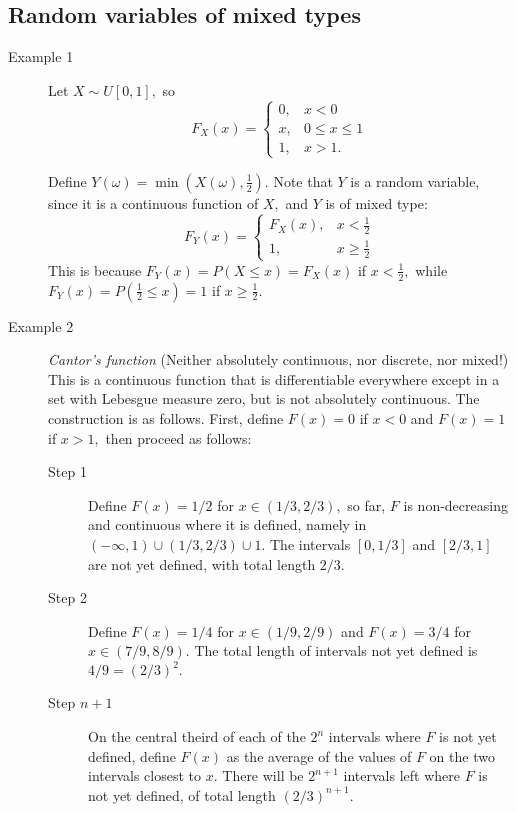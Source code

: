 \documentclass[12pt]{report} \addtolength{\textheight}{2in}
\begin{document}
\subsection*{Random variables of mixed types}
\begin{description}
\item[Example 1]
Let $X \sim U[0,1],$ so
\begin{displaymath}
F_X(x)=
\begin{cases}
0, & x <0\\
x, & 0\leq x \leq 1\\
1, & x > 1.
\end{cases}
\end{displaymath}

Define $Y(\omega)=\min (X(\omega),\frac{1}{2}).$ Note that $Y$ is a random variable, since it is a continuous function of $X,$ and $Y$ is of mixed type:
\begin{displaymath}
F_Y(x)= 
\begin{cases}
F_X(x), & x <\frac{1}{2}\\
1,& x \geq \frac{1}{2}
\end{cases}
\end{displaymath}
This is because $F_Y(x)=P(X \leq x)= F_X(x)$ if $x < \frac{1}{2},$ while $F_Y(x)=P(\frac{1}{2} \leq x)=1$ if $x\geq \frac{1}{2}.$
\item[Example 2] \textit{Cantor's function} (Neither absolutely continuous, nor discrete, nor mixed!) This is a continuous function that is differentiable everywhere except in a set with Lebesgue measure zero, but is not absolutely continuous. The construction is as follows. First, define $F(x)=0$ if $x < 0$ and $F(x)=1$ if $x > 1,$ then proceed as follows:
\begin{description}
\item[Step 1] Define $F(x)=1/2$ for $x\in(1/3, 2/3),$ so far, $F$ is non-decreasing and continuous where it is defined, namely in $(-\infty,1) \cup (1/3, 2/3) \cup 1.$ The intervals $[0,1/3]$ and $[2/3,1]$ are not yet defined, with total length $2/3.$
\item[Step 2] Define $F(x)=1/4$ for $x\in (1/9,2/9)$ and $F(x)=3/4$ for $x\in (7/9,8/9).$ The total length of intervals not yet defined is $4/9=(2/3)^2.$
\item[Step $n+1$] On the central theird of each of the $2^n$ intervals where $F$ is not yet defined, define $F(x)$ as the average of the values of $F$ on the two intervals closest to $x.$ There will be $2^{n+1}$ intervals left where $F$ is not yet defined, of total length $(2/3)^{n+1}.$
\end{description}
\end{description}
\end{document}
